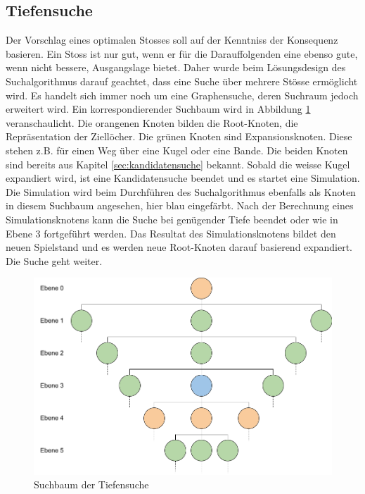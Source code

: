 \subsection{Tiefensuche}
Der Vorschlag eines optimalen Stosses soll auf der Kenntniss der Konsequenz basieren. Ein Stoss ist nur gut, wenn
er für die Darauffolgenden eine ebenso gute, wenn nicht bessere, Ausgangslage bietet. Daher wurde beim Lösungsdesign
des Suchalgorithmus darauf geachtet, dass eine Suche über mehrere Stösse ermöglicht wird. Es handelt sich immer noch
um eine Graphensuche, deren Suchraum jedoch erweitert wird. Ein korrespondierender Suchbaum wird in Abbildung \ref{fig:suchbaum_tiefensuche}
veranschaulicht. Die orangenen Knoten bilden die Root-Knoten, die Repräsentation der Ziellöcher. Die grünen Knoten sind
Expansionsknoten. Diese stehen z.B. für einen Weg über eine Kugel oder eine Bande. Die beiden Knoten sind bereits aus
Kapitel \ref{sec:kandidatensuche} bekannt. Sobald die weisse Kugel expandiert wird, ist eine Kandidatensuche beendet und
es startet eine Simulation. Die Simulation wird beim Durchführen des Suchalgorithmus ebenfalls als Knoten in diesem
Suchbaum angesehen, hier blau eingefärbt. Nach der Berechnung eines Simulationsknotens kann die Suche bei genügender
Tiefe beendet oder wie in Ebene 3 fortgeführt werden. Das Resultat des Simulationsknotens bildet den neuen Spielstand
und es werden neue Root-Knoten darauf basierend expandiert. Die Suche geht weiter.

\begin{figure}[h!]
    \begin{center}
        \includegraphics[width=0.5\linewidth]{../common/03_billiard_ai/resources/38_tiefensuche_suchbaum.png}
    \end{center}
    \caption{Suchbaum der Tiefensuche}
    \label{fig:suchbaum_tiefensuche}
\end{figure}


